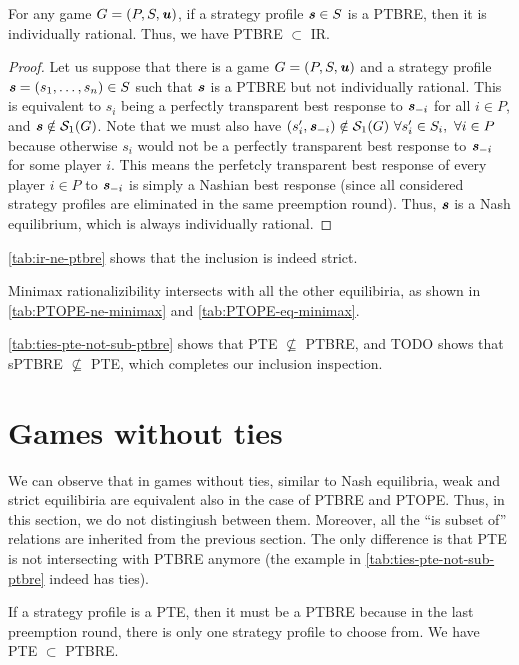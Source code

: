 \begin{lemma}
	\label{th:ptbre-subset-ir}
	For any game $G = (P, S, \boldsymbol{\mathit{u}})$, if a strategy profile $\boldsymbol{\mathit{s}} \in S$ is a PTBRE, then it is individually rational.
	Thus, we have PTBRE $\subset$ IR.
\end{lemma}

\begin{proof}
	Let us suppose that there is a game $G = (P, S, \boldsymbol{\mathit{u}})$ and a strategy profile $\boldsymbol{\mathit{s}} = (s_1, \dots, s_n) \in S$ such that $\boldsymbol{\mathit{s}}$ is a PTBRE but not individually rational.
	This is equivalent to $s_i$ being a perfectly transparent best response to $\boldsymbol{\mathit{s}}_{-i}$ for all $i \in P$, and $\boldsymbol{\mathit{s}} \notin \mathcal{S}_1(G)$.
	Note that we must also have $(s_i', \boldsymbol{\mathit{s}}_{-i}) \notin \mathcal{S}_1(G)\ \forall s_i' \in S_i,\ \forall i \in P$ because otherwise $s_i$ would not be a perfectly transparent best response to $\boldsymbol{\mathit{s}}_{-i}$ for some player $i$.
	This means the perfetcly transparent best response of every player $i \in P$ to $\boldsymbol{\mathit{s}}_{-i}$ is simply a Nashian best response (since all considered strategy profiles are eliminated in the same preemption round).
	Thus, $\boldsymbol{\mathit{s}}$ is a Nash equilibrium, which is always individually rational.
\end{proof}

\begin{remark}
	\autoref{tab:ir-ne-ptbre} shows that the inclusion is indeed strict.
\end{remark}

Minimax rationalizibility intersects with all the other equilibiria, as shown in \autoref{tab:PTOPE-ne-minimax} and \autoref{tab:PTOPE-eq-minimax}.

\autoref{tab:ties-pte-not-sub-ptbre} shows that PTE $\not\subseteq$ PTBRE, and TODO shows that sPTBRE $\not\subseteq$ PTE, which completes our inclusion inspection.


\section{Games without ties}
We can observe that in games without ties, similar to Nash equilibria, weak and strict equilibiria are equivalent also in the case of PTBRE and PTOPE.
Thus, in this section, we do not distingiush between them.
Moreover, all the \enquote{is subset of} relations are inherited from the previous section.
The only difference is that PTE is not intersecting with PTBRE anymore (the example in \autoref{tab:ties-pte-not-sub-ptbre} indeed has ties).

\begin{observation}
	\label{th:ptbre-subset-pte}
	If a strategy profile is a PTE, then it must be a PTBRE because in the last preemption round, there is only one strategy profile to choose from.
	We have PTE $\subset$ PTBRE.
\end{observation}

